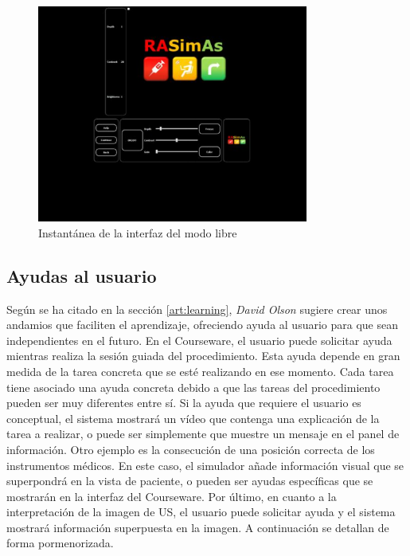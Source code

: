 \begin{figure}[h]
    \centering
    \includegraphics[width=0.8\textwidth]{IMG/freeui.PNG}
    \caption{Instantánea de la interfaz del modo libre}
    \label{fig:freeui}
\end{figure}


 

\subsection{Ayudas al usuario}
\label{course:ayudas}

Según se ha citado en la sección \ref{art:learning}, \emph{David Olson} \cite{olson2014jerome} sugiere crear unos andamios que faciliten el aprendizaje, ofreciendo ayuda al usuario para que sean independientes en el futuro. En el \ac{Courseware}, el usuario puede solicitar ayuda mientras realiza la sesión guiada del procedimiento. Esta ayuda depende en gran medida de la tarea concreta que se esté realizando en ese momento. Cada tarea tiene asociado una ayuda concreta debido a que las tareas del procedimiento pueden ser muy diferentes entre sí. Si la ayuda que requiere el usuario es conceptual, el sistema mostrará un vídeo que contenga una explicación de la tarea a realizar, o puede ser simplemente que muestre un mensaje en el panel de información. Otro ejemplo es la consecución de una posición correcta de los instrumentos médicos. En este caso, el simulador añade información visual que se superpondrá en la vista de paciente, o pueden ser ayudas específicas que se mostrarán en la interfaz del \ac{Courseware}. Por último, en cuanto a la interpretación de la imagen de \ac{US}, el usuario puede solicitar ayuda y el sistema mostrará información superpuesta en la imagen. A continuación se detallan de forma pormenorizada.


